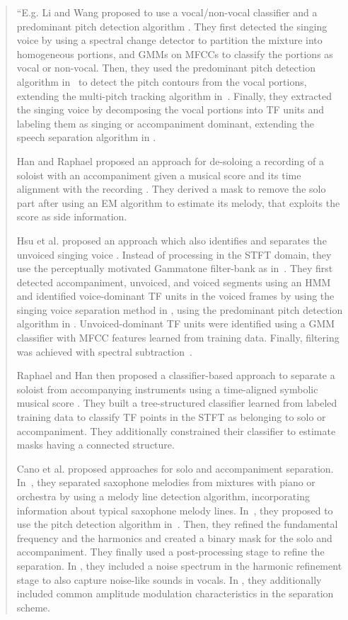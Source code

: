 \begin{quote}
``E.g. Li and Wang proposed to use a vocal/non-vocal classifier and a predominant pitch detection algorithm \cite{li06, li07}. They first detected the singing voice by using a spectral change detector \cite{duxbury03} to partition the mixture into homogeneous portions, and GMMs on MFCCs to classify the portions as vocal or non-vocal. Then, they used the predominant pitch detection algorithm in~\cite{li05} to detect the pitch contours from the vocal portions, extending the multi-pitch tracking algorithm in~\cite{wu03}. Finally, they extracted the singing voice by decomposing the vocal portions into TF units and labeling them as singing or accompaniment dominant, extending the speech separation algorithm in \cite{hu02}.
\par
Han and Raphael proposed an approach for de-soloing a recording of a soloist with an accompaniment given a musical score and its time alignment with the recording \cite{han07}. They derived a mask \cite{roweis01} to remove the solo part after using an EM algorithm to estimate its melody, that exploits the score as side information.
\par
Hsu et al. proposed an approach which also identifies and separates the unvoiced singing voice \cite{hsu08,hsu10}. Instead of processing in the STFT domain, they use the perceptually motivated Gammatone filter-bank as in~\cite{hu02,li07}. They first detected accompaniment, unvoiced, and voiced segments using an HMM and identified voice-dominant TF units in the voiced frames by using the singing voice separation method in \cite{li07}, using the predominant pitch detection algorithm in \cite{dressler062}. Unvoiced-dominant TF units were identified using a GMM classifier with MFCC features learned from training data. Finally, filtering was achieved with spectral subtraction~\cite{scalart96}.
\par
Raphael and Han then proposed a classifier-based approach to separate a soloist from accompanying instruments using a time-aligned symbolic musical score \cite{raphael08}. They built a tree-structured classifier \cite{breiman84} learned from labeled training data to classify TF points in the STFT as belonging to solo or accompaniment. They additionally constrained their classifier to estimate masks having a connected structure.
\par
Cano et al. proposed approaches for solo and accompaniment separation. In~\cite{cano09}, they separated saxophone melodies from mixtures with piano or orchestra by using a melody line detection algorithm, incorporating information about typical saxophone melody lines. In~\cite{grollmisch11,dittmar12,cano12}, they proposed to use the pitch detection algorithm in~\cite{dressler11}. Then, they refined the fundamental frequency and the harmonics and created a binary mask for the solo and accompaniment. They finally used a post-processing stage to refine the separation. In \cite{cano13}, they included a noise spectrum in the harmonic refinement stage to also capture noise-like sounds in vocals. In \cite{cano14}, they additionally included common amplitude modulation characteristics in the separation scheme.

\end{quote}
